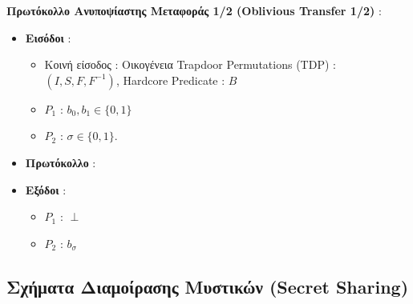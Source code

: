 \begin{definition}
\label{def:oblivious_transfer}
\textbf{Πρωτόκολλο Ανυποψίαστης Μεταφοράς 1/2 (Oblivious Transfer 1/2)} \cite{even1985randomized} : 
\begin{itemize}
\item \textbf{Εισόδοι} : 
    \begin{itemize}
    \item Κοινή είσοδος : Οικογένεια Trapdoor Permutations (TDP) : $(I, S, F, F^{-1})$, Hardcore Predicate : $B$
    \item $P_{1}$ : $b_{0}, b_{1} \in\{0,1\}$
    \item $P_{2}$ : $\sigma \in\{0,1\}$.
    \end{itemize}
\item \textbf{Πρωτόκολλο} : \\

\item \textbf{Εξόδοι} :
    \begin{itemize}
        \item $P_1$ : $\perp$
        \item $P_{2}$ : $b_σ$
    \end{itemize}
\end{itemize}
\end{definition}

\subsection{Σχήματα Διαμοίρασης Μυστικών (Secret Sharing)}

